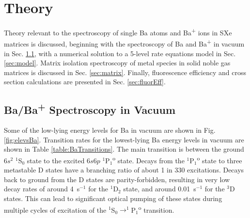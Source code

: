 \chapter{Theory}
\label{chapter:theory}

Theory relevant to the spectroscopy of single Ba atoms and Ba\textsuperscript{+} ions in SXe matrices is discussed, beginning with the spectroscopy of Ba and Ba\textsuperscript{+} in vacuum in Sec. \ref{sec:vacuum}, with a numerical solution to a 5-level rate equations model in Sec. \ref{sec:model}.  Matrix isolation spectroscopy of metal species in solid noble gas matrices is discussed in Sec. \ref{sec:matrix}.  Finally, fluorescence efficiency and cross section calculations are presented in Sec. \ref{sec:fluorEff}.

\section{Ba/Ba\textsuperscript{+} Spectroscopy in Vacuum}
\label{sec:vacuum}

Some of the low-lying energy levels for Ba in vacuum are shown in Fig. \ref{fig:elevsBa}.  Transition rates for the lowest-lying Ba energy levels in vacuum are shown in Table \ref{table:BaTransitions}.  The main transition is between the ground $6s^{2}$ $^{1}$S$_{0}$ state to the excited $6s6p$ $^{1}$P$_{1}$\textsuperscript{o} state.  Decays from the $^{1}$P$_{1}$\textsuperscript{o} state to three metastable D states have a branching ratio of about 1 in 330 excitations.  Decays back to ground from the D states are parity-forbidden, resulting in very low decay rates of around 4~s$^{-1}$ for the $^{1}$D$_{2}$ state, and around 0.01~s$^{-1}$ for the $^{3}$D states.  This can lead to significant optical pumping of these states during multiple cycles of excitation of the  $^{1}$S$_{0} \rightarrow ^{1}$P$_{1}$\textsuperscript{o} transition.


